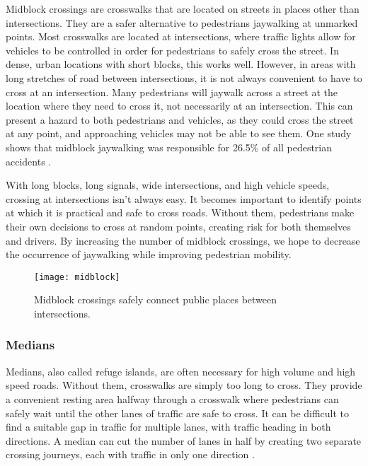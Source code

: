 Midblock crossings are crosswalks that are located on streets in places other than intersections.  They are a safer alternative to pedestrians jaywalking at unmarked points.  Most crosswalks are located at intersections, where traffic lights allow for vehicles to be controlled in order for pedestrians to safely cross the street.  In dense, urban locations with short blocks, this works well.  However, in areas with long stretches of road between intersections, it is not always convenient to have to cross at an intersection.  Many pedestrians will jaywalk across a street at the location where they need to cross it, not necessarily at an intersection.  This can present a hazard to both pedestrians and vehicles, as they could cross the street at any point, and approaching vehicles may not be able to see them.  One study shows that midblock jaywalking was responsible for 26.5\% of all pedestrian accidents \cite{mid1}.

With long blocks, long signals, wide intersections, and high vehicle speeds, crossing at intersections isn’t always easy.  It becomes important to identify points at which it is practical and safe to cross roads.  Without them, pedestrians make their own decisions to cross at random points, creating risk for both themselves and drivers.  By increasing the number of midblock crossings, we hope to decrease the occurrence of jaywalking while improving pedestrian mobility.

\begin{figure}[!htbp]
\centering
\texttt{[image: midblock]}
\caption[Midblock Crossing]{Midblock crossings safely connect public places between intersections.}\label{fig:midblock}
\end{figure}

\subsubsection{Medians}
Medians, also called refuge islands, are often necessary for high volume and high speed roads.  Without them, crosswalks are simply too long to cross.  They provide a convenient resting area halfway through a crosswalk where pedestrians can safely wait until the other lanes of traffic are safe to cross.  It can be difficult to find a suitable gap in traffic for multiple lanes, with traffic heading in both directions.  A median can cut the number of lanes in half by creating two separate crossing journeys, each with traffic in only one direction \cite{mid2}. 


